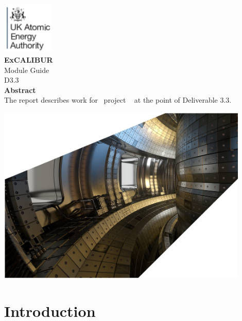 \documentclass[11pt,twoside,a4paper]{article}
\newcommand{\culhamtitle}{\LARGE Module Guide  \\[1.0\baselineskip] D3.3 }%
\begin{document}
\begin{titlepage}%
\vspace*{-30mm}%
\includegraphics[width=2.5cm]{../corpics/cofaplus.png} \\[2.0\baselineskip]%
{\LARGE {\textbf{\textsf{ExCALIBUR}}}}\\[2.0\baselineskip]%
{\LARGE \culhamtitle } \\[2.0\baselineskip]%
{\textbf{\textsf{Abstract}}}\\%
The report describes work for \exc \ project \nep \ %
at the point of Deliverable 3.3. %
\vfill%
\centerline{\includegraphics[width=0.9\textwidth]{../corpics/tokintcrop}}%
\end{titlepage}%



\clearpage
\section{Introduction}\label{sec:intro}

\clearpage
\end{document}
